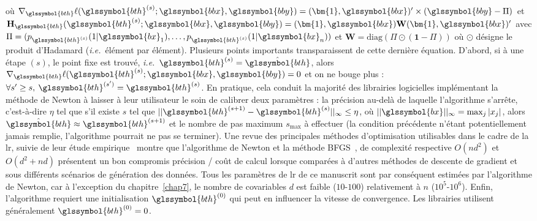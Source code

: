où $ \nabla_{\glssymbol{bth}} \ell(\glssymbol{bth}^{(s)};\glssymbol{bbx},\glssymbol{bby}) = (\bm{1},\glssymbol{bbx})' \times (\glssymbol{bby} - \Pi)$ et $\mathbf{H}_{{\glssymbol{bth}}}(\glssymbol{bth}^{(s)};\glssymbol{bbx},\glssymbol{bby}) = (\bm{1},\glssymbol{bbx}) \mathbf{W} (\bm{1},\glssymbol{bbx})'$ avec $\Pi = (p_{\glssymbol{bth}^{(s)}}(1|\glssymbol{bx}_1),\dots,p_{\glssymbol{bth}^{(s)}}(1|\glssymbol{bx}_n))$ et $\mathbf{W} = \text{diag}(\Pi \odot (\bm{1}-\Pi))$ où $\odot$ désigne le produit d'Hadamard (\textit{i.e.}\ élément par élément). Plusieurs points importants transparaissent de cette dernière équation. D'abord, si à une étape $(s)$, le point fixe est trouvé, \textit{i.e.}\ $\glssymbol{bth}^{(s)} = \hat{\glssymbol{bth}}$, alors $\nabla_{\glssymbol{bth}} \ell(\glssymbol{bth}^{(s)};\glssymbol{bbx},\glssymbol{bby}) = 0$ et on ne bouge plus : $\forall s' \geq s, \: \glssymbol{bth}^{(s')} = \glssymbol{bth}^{(s)}$. En pratique, cela conduit la majorité des librairies logicielles implémentant la méthode de Newton à laisser à leur utilisateur le soin de calibrer deux paramètres : la précision au-delà de laquelle l'algorithme s'arrête, c'est-à-dire $\eta$ tel que s'il existe $s$ tel que $||\glssymbol{bth}^{(s+1)} - \glssymbol{bth}^{(s)}||_{\infty} \leq \eta$, où $|| \glssymbol{bx} ||_{\infty} = \max_{j} |x_j|$, alors $\hat{\glssymbol{bth}} \approx \glssymbol{bth}^{(s+1)}$ et le nombre de pas maximum $s_{\text{max}}$ à effectuer (la condition précédente n'étant potentiellement jamais remplie, l'algorithme pourrait ne pas se terminer). Une revue des principales méthodes d'optimisation utilisables dans le cadre de la \gls{lr}, suivie de leur étude empirique~\cite{minka2003comparison} montre que l'algorithme de Newton et la méthode BFGS~\cite{byrd1995limited}, de complexité respective $O(nd^2)$ et $O(d^2 + nd)$ présentent un bon compromis précision / coût de calcul lorsque comparées à d'autres méthodes de descente de gradient et sous différents scénarios de génération des données. Tous les paramètres de \gls{lr} de ce manuscrit sont par conséquent estimées par l'algorithme de Newton, car à l'exception du chapitre~\ref{chap7}, le nombre de covariables $d$ est faible ($10$-$100$) relativement à $n$ ($10^5$-$10^6$). Enfin, l'algorithme requiert une initialisation $\glssymbol{bth}^{(0)}$ qui peut en influencer la vitesse de convergence. Les librairies utilisent généralement $\glssymbol{bth}^{(0)}=0$.

